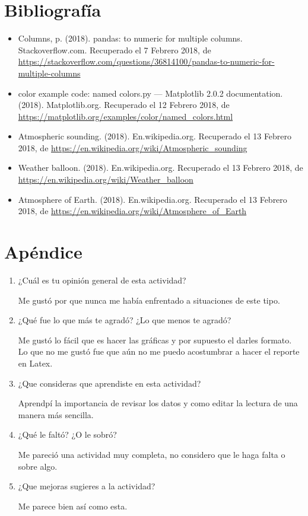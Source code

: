 \documentclass{article}
\begin{document}
\section{Bibliografía}
\begin{itemize}
\item Columns, p. (2018). pandas: to numeric for multiple columns. Stackoverflow.com. Recuperado el 7 Febrero 2018, de \url{https://stackoverflow.com/questions/36814100/pandas-to-numeric-for-multiple-columns}

\item color example code: named colors.py — Matplotlib 2.0.2 documentation. (2018). Matplotlib.org. Recuperado el 12 Febrero 2018, de \url{https://matplotlib.org/examples/color/named_colors.html}

\item Atmospheric sounding. (2018). En.wikipedia.org. Recuperado el 13 Febrero 2018, de \url{https://en.wikipedia.org/wiki/Atmospheric_sounding}

\item Weather balloon. (2018). En.wikipedia.org. Recuperado el 13 Febrero 2018, de \url{https://en.wikipedia.org/wiki/Weather_balloon}

\item Atmosphere of Earth. (2018). En.wikipedia.org. Recuperado el 13 Febrero 2018, de \url{https://en.wikipedia.org/wiki/Atmosphere_of_Earth}

\end{itemize}

\section{Apéndice}
\begin{enumerate}
\item¿Cuál es tu opinión general de esta actividad?

Me gustó por que nunca me había enfrentado a situaciones de este tipo.

\item¿Qué fue lo que más te agradó? ¿Lo que menos te agradó?

Me gustó lo fácil que es hacer las gráficas y por supuesto el darles formato. Lo que no me gustó fue que aún no me puedo acostumbrar a hacer el reporte en Latex.

\item¿Que consideras que aprendiste en esta actividad?

Aprendpí la importancia de revisar los datos y como editar la lectura de una manera más sencilla.

\item¿Qué le faltó? ¿O le sobró?

Me pareció una actividad muy completa, no considero que le haga falta o sobre algo.

\item¿Que mejoras sugieres a la actividad?

Me parece bien así como esta.
\end{enumerate}
\end{document}
